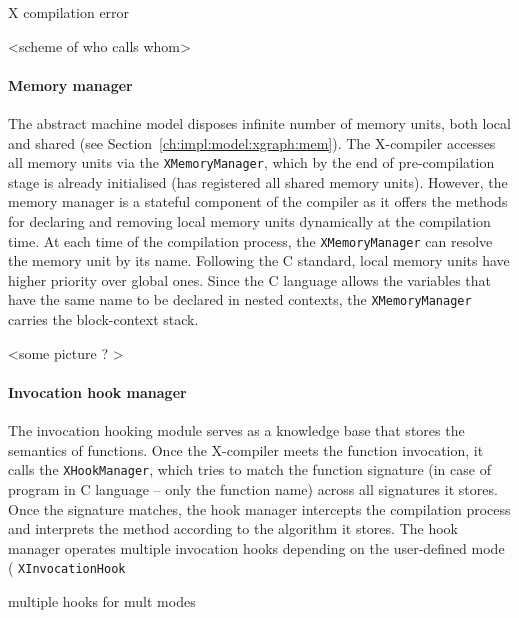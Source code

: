 X compilation error

<scheme of who calls whom>



\paragraph{Memory manager}
\label{ch:impl:proc:x-compiler:mem}

The \xgraph{} abstract machine model disposes infinite number of memory units, both local and shared (see Section~\ref{ch:impl:model:xgraph:mem}).
The X-compiler accesses all memory units via the \texttt{XMemoryManager}, which by the end of pre-compilation stage is already initialised (has registered all shared memory units).
However, the memory manager is a stateful component of the compiler as it offers the methods for declaring and removing local memory units dynamically at the compilation time.
At each time of the compilation process, the \texttt{XMemoryManager} can resolve the memory unit by its name.
Following the C standard, local memory units have higher priority over global ones.
Since the C language allows the variables that have the same name to be declared in nested contexts, the \texttt{XMemoryManager} carries the block-context stack. %

<some picture ? >

\paragraph{Invocation hook manager}
\label{ch:impl:proc:x-compiler:hooking}

The invocation hooking module serves as a knowledge base that stores the semantics of functions.
Once the X-compiler meets the function invocation, it calls the \texttt{XHookManager}, which tries to match the function signature (in case of program in C language -- only the function name) across all signatures it stores.
Once the signature matches, the hook manager intercepts the compilation process and interprets the method according to the algorithm it stores.
The hook manager operates multiple invocation hooks depending on the user-defined mode (
 \texttt{XInvocationHook} 

multiple hooks for mult modes

